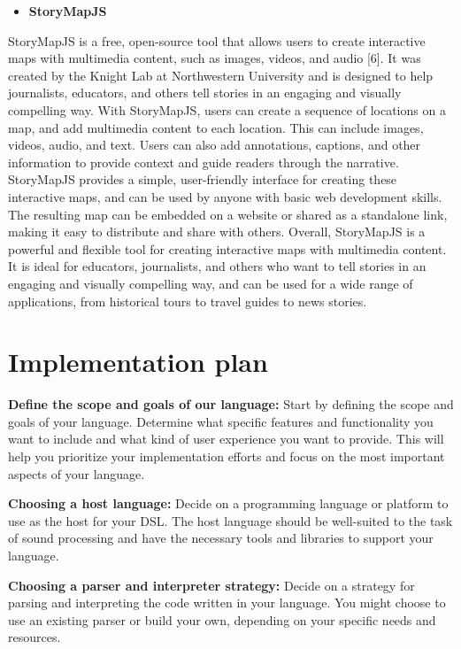  \begin{itemize}
                \item \textbf{StoryMapJS}
 \end{itemize}

 StoryMapJS is a free, open-source tool that allows users to create interactive maps with multimedia content, such as images, videos, and audio [6]. It was created by the Knight Lab at Northwestern University and is designed to help journalists, educators, and others tell stories in an engaging and visually compelling way.
With StoryMapJS, users can create a sequence of locations on a map, and add multimedia content to each location. This can include images, videos, audio, and text. Users can also add annotations, captions, and other information to provide context and guide readers through the narrative.
StoryMapJS provides a simple, user-friendly interface for creating these interactive maps, and can be used by anyone with basic web development skills. The resulting map can be embedded on a website or shared as a standalone link, making it easy to distribute and share with others.
Overall, StoryMapJS is a powerful and flexible tool for creating interactive maps with multimedia content. It is ideal for educators, journalists, and others who want to tell stories in an engaging and visually compelling way, and can be used for a wide range of applications, from historical tours to travel guides to news stories.





\section{Implementation plan}

\textbf {Define the scope and goals of our language:} Start by defining the scope and goals of your language. Determine what specific features and functionality you want to include and what kind of user experience you want to provide. This will help you prioritize your implementation efforts and focus on the most important aspects of your language. 

\textbf {Choosing a host language:} Decide on a programming language or platform to use as the host for your DSL. The host language should be well-suited to the task of sound processing and have the necessary tools and libraries to support your language. 

\textbf {Choosing a parser and interpreter strategy:} Decide on a strategy for parsing and interpreting the code written in your language. You might choose to use an existing parser or build your own, depending on your specific needs and resources. 

